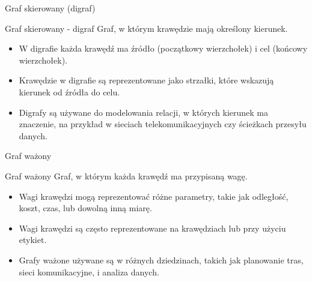 \documentclass[polish,envcountsect,10pt]{beamer}
\begin{document}
\begin{frame}{Graf skierowany (digraf)}
    \begin{block}{Graf skierowany - digraf}
        Graf, w którym krawędzie mają określony kierunek.
        \begin{itemize}
        \item W digrafie każda krawędź ma źródło (początkowy wierzchołek) i cel (końcowy wierzchołek).
        \item Krawędzie w digrafie są reprezentowane jako strzałki, które wskazują kierunek od źródła do celu.
        \item Digrafy są używane do modelowania relacji, w których kierunek ma znaczenie, na przykład w sieciach telekomunikacyjnych czy ścieżkach przesyłu danych.
        \end{itemize}
    \end{block}

    \begin{center}
    \end{center}
\end{frame}

\begin{frame}{Graf ważony}
    \begin{block}{Graf ważony}
        Graf, w którym każda krawędź ma przypisaną wagę.
        \begin{itemize}
            \item Wagi krawędzi mogą reprezentować różne parametry, takie jak odległość, koszt, czas, lub dowolną inną miarę.
            \item Wagi krawędzi są często reprezentowane na krawędziach lub przy użyciu etykiet.
            \item Grafy ważone używane są w różnych dziedzinach, takich jak planowanie tras, sieci komunikacyjne, i analiza danych.
        \end{itemize}
    \end{block}
    \begin{center}
    \end{center}
\end{frame}
\end{document}
